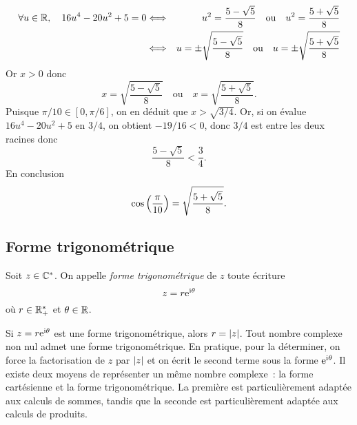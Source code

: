 \documentclass{magnoliaold}
\begin{document}
\begin{exos}
\begin{sol}
\begin{eqnarray*}
\forall u\in\mathbb{R},\quad 16u^4-20u^2+5=0
&\Longleftrightarrow& u^2=\frac{5-\sqrt{5}}{8} \quad\text{ou}\quad  u^2=\frac{5+\sqrt{5}}{8}\\
&\Longleftrightarrow& u=\pm\sqrt{\frac{5-\sqrt{5}}{8}} \quad\text{ou}\quad  u=\pm\sqrt{\frac{5+\sqrt{5}}{8}}
\end{eqnarray*}
Or $x>0$ donc
\[x=\sqrt{\frac{5-\sqrt{5}}{8}} \quad\text{ou}\quad x=\sqrt{\frac{5+\sqrt{5}}{8}}.\]
Puisque $\pi/10\in[0,\pi/6]$, on en déduit que $x>\sqrt{3/4}$. Or, si on évalue $16u^4-20u^2+5$ en $3/4$, on obtient $-19/16<0$, donc $3/4$ est entre les deux racines donc
\[\frac{5-\sqrt{5}}{8}<\frac{3}{4}.\]
En conclusion
\[\cos\left(\frac{\pi}{10}\right)=\sqrt{\frac{5+\sqrt{5}}{8}}.\]
\end{sol}
\end{exos}



\subsection{Forme trigonométrique}

\begin{definition}
Soit $z\in\mathbb{C}^*$. On appelle \emph{forme trigonométrique} de $z$ toute écriture
\[z=r {\rm e}^{{\rm i}\theta}\]
où $r\in\mathbb{R}_+^*$ et $\theta\in\mathbb{R}$.
\end{definition}

\begin{remarques}
\remarque Si $z=r{\rm e}^{{\rm i}\theta}$ est une forme trigonométrique, alors $r=\left|z\right|$.
\remarque Tout nombre complexe non nul admet une forme trigonométrique. En pratique,
pour la déterminer, on force la factorisation de $z$ par $\left|z\right|$ et on écrit le second terme sous la forme ${\rm e}^{{\rm i}\theta}$.
\remarque Il existe deux moyens de représenter un même nombre
  complexe~: la forme cartésienne et la forme trigonométrique. La première
  est particulièrement adaptée aux calculs de sommes, tandis que la seconde
  est particulièrement adaptée aux calculs de produits.
\end{remarques}
\end{document}
